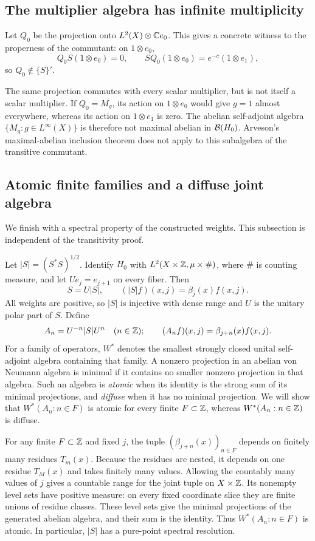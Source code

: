 \subsection{The multiplier algebra has infinite multiplicity}
Let $Q_0$ be the projection onto $L^2(X)\otimes\mathbb C e_0$. This gives a
concrete witness to the properness of the commutant: on $1\otimes e_0$,
\[
 Q_0S(1\otimes e_0)=0,\qquad
 SQ_0(1\otimes e_0)=e^{-c}(1\otimes e_1),
\]
so $Q_0\notin\{S\}'$.

The same projection commutes with every scalar multiplier, but is not
itself a scalar multiplier. If $Q_0=M_g$, its action on $1\otimes e_0$
would give $g=1$ almost everywhere, whereas its action on
$1\otimes e_1$ is zero. The abelian self-adjoint algebra
$\{M_g:g\in L^\infty(X)\}$ is therefore not maximal abelian in
$\mathcal B(H_0)$. Arveson's maximal-abelian inclusion theorem
\cite[Theorem~3.3]{Arveson1967} does not apply to this subalgebra of the
transitive commutant.

\subsection{Atomic finite families and a diffuse joint algebra}
We finish with a spectral property of the constructed weights. This
subsection is independent of the transitivity proof.

Let $|S|=(S^*S)^{1/2}$. Identify $H_0$ with
$L^2(X\times\mathbb Z,\mu\times\#)$, where $\#$ is counting measure,
and let $Ue_j=e_{j+1}$ on every fiber. Then
\[
 S=U|S|,\qquad (|S|f)(x,j)=\beta_j(x)f(x,j).
\]
All weights are positive, so $|S|$ is injective with dense range and
$U$ is the unitary polar part of $S$. Define
\[
 A_n=U^{-n}|S|U^n\quad(n\in\mathbb Z);
 \qquad (A_nf)(x,j)=\beta_{j+n}(x)f(x,j).
\]
For a family of operators, $W^*$ denotes the smallest strongly closed
unital self-adjoint algebra containing that family. A nonzero projection
in an abelian von Neumann algebra is minimal if it contains no smaller
nonzero projection in that algebra. Such an algebra is \emph{atomic}
when its identity is the strong sum of its minimal projections, and
\emph{diffuse} when it has no minimal projection. We will show that
$W^*(A_n:n\in F)$ is atomic for every finite $F\subset\mathbb Z$, whereas
$W^*(A_n:n\in\mathbb Z)$ is diffuse.

For any finite $F\subset\mathbb Z$ and fixed $j$, the tuple
$(\beta_{j+n}(x))_{n\in F}$ depends on finitely many residues $T_m(x)$.
Because the residues are nested, it depends on one residue $T_M(x)$
and takes finitely many values. Allowing the countably many values of
$j$ gives a countable range for the joint tuple on $X\times\mathbb Z$.
Its nonempty level sets have positive measure: on every fixed coordinate
slice they are finite unions of residue classes. These level sets give
the minimal projections of the generated abelian algebra, and their
sum is the identity. Thus $W^*(A_n:n\in F)$ is atomic. In particular,
$|S|$ has a pure-point spectral resolution.

